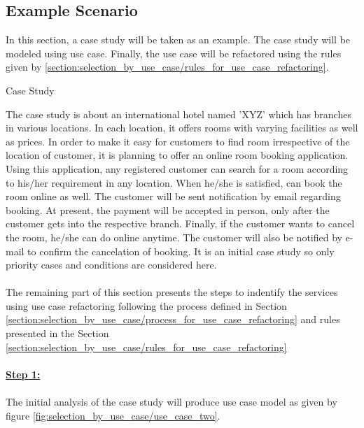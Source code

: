 \subsection{Example Scenario}\label{section:selection_by_use_case/refactoring_example}
In this section, a case study will be taken as an example. The case study will be modeled using use case. Finally, the use case will be refactored using the rules given by \ref{section:selection_by_use_case/rules_for_use_case_refactoring}.
\\
\begin{shaded} Case Study \end{shaded}
The case study is about an international hotel named 'XYZ' which has branches in various locations. In each location, it offers rooms with varying facilities as well as prices. In order to make it easy for customers to find room irrespective of the location of customer, it is planning to offer an online room booking application. Using this application, any registered customer can search for a room according to his/her requirement in any location. When he/she is satisfied, can book the room online as well. The customer will be sent notification by email regarding booking. At present, the payment will be accepted in person, only after the customer gets into the respective branch. Finally, if the customer wants to cancel the room, he/she can do online anytime. The customer will also be notified by e-mail to confirm the cancelation of booking. It is an initial case study so only priority cases and conditions are considered here.
\\
\\
The remaining part of this section presents the steps to indentify the services using use case refactoring following the process defined in Section \ref{section:selection_by_use_case/process_for_use_case_refactoring} and rules presented in the Section \ref{section:selection_by_use_case/rules_for_use_case_refactoring}
\\
\\
\textbf{\underline{Step 1:}}
\\
\\
The initial analysis of the case study will produce use case model as given by figure \ref{fig:selection_by_use_case/use_case_two}.

